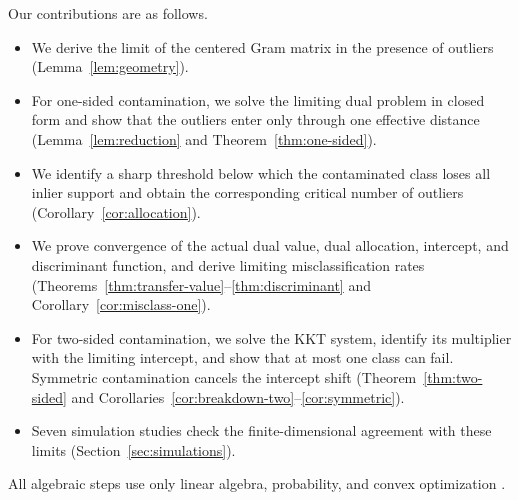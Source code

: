 Our contributions are as follows.
\begin{itemize}
  \item We derive the limit of the centered Gram matrix in the presence of outliers (Lemma~\ref{lem:geometry}).
  \item For one-sided contamination, we solve the limiting dual problem in closed form and show that the outliers enter only through one effective distance (Lemma~\ref{lem:reduction} and Theorem~\ref{thm:one-sided}).
  \item We identify a sharp threshold below which the contaminated class loses all inlier support and obtain the corresponding critical number of outliers (Corollary~\ref{cor:allocation}).
  \item We prove convergence of the actual dual value, dual allocation, intercept, and discriminant function, and derive limiting misclassification rates (Theorems~\ref{thm:transfer-value}--\ref{thm:discriminant} and Corollary~\ref{cor:misclass-one}).
  \item For two-sided contamination, we solve the KKT system, identify its multiplier with the limiting intercept, and show that at most one class can fail. Symmetric contamination cancels the intercept shift (Theorem~\ref{thm:two-sided} and Corollaries~\ref{cor:breakdown-two}--\ref{cor:symmetric}).
  \item Seven simulation studies check the finite-dimensional agreement with these limits (Section~\ref{sec:simulations}).
\end{itemize}

All algebraic steps use only linear algebra, probability, and convex optimization \citep{boyd2004}.
